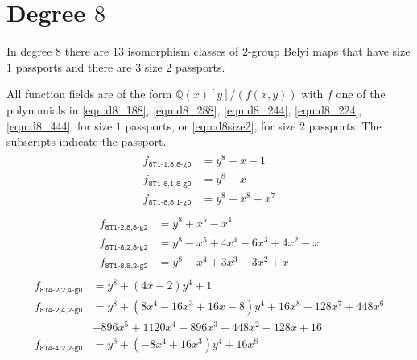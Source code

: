 \documentclass{dcthesis}
\newcommand{\QQ}{\mathbb Q}
\numberwithin{equation}{section}
\theoremstyle{definition}
\theoremstyle{remark}
\begin{document}
{{  \section{Degree $8$}{
    \label{sec:d8}
    In degree $8$ there are $13$
    isomorphism classes of $2$-group Belyi maps
    that have size $1$ passports
    and there are $3$ size $2$ passports.
    \par
    All function fields are of the form
    $\QQ(x)[y]/(f(x,y))$
    with $f$ one of the polynomials in
    \eqref{eqn:d8_188},
    \eqref{eqn:d8_288},
    \eqref{eqn:d8_244},
    \eqref{eqn:d8_224},
    \eqref{eqn:d8_444}, for size $1$ passports,
    or
    \eqref{eqn:d8size2},
    for size $2$ passports.
    The subscripts indicate the passport.
    \begin{align}
      \label{eqn:d8_188}
      \begin{split}
        f_{\texttt{8T1-1,8,8-g0}}
        &= y^8 + x - 1\\
        f_{\texttt{8T1-8,1,8-g0}}
        &= y^8 - x\\
        f_{\texttt{8T1-8,8,1-g0}}
        &= y^8 - x^8 + x^7
      \end{split}
    \end{align}
    \begin{align}
      \label{eqn:d8_288}
      \begin{split}
        f_{\texttt{8T1-2,8,8-g2}}
        &= y^8 + x^5 - x^4\\
        f_{\texttt{8T1-8,2,8-g2}}
        &= y^8 - x^5 + 4x^4 - 6x^3 + 4x^2 - x\\
        f_{\texttt{8T1-8,8,2-g2}}
        &= y^8 - x^4 + 3x^3 - 3x^2 + x
      \end{split}
    \end{align}
    \begin{align}
      \label{eqn:d8_224}
      \begin{split}
        f_{\texttt{8T4-2,2,4-g0}}
        &= y^8 + (4x - 2)y^4 + 1\\
        f_{\texttt{8T4-2,4,2-g0}}
        &= y^8 + (8x^4 - 16x^3 + 16x - 8)y^4 + 16x^8 - 128x^7 + 448x^6\\
        &- 896x^5 + 1120x^4 - 896x^3 + 448x^2 - 128x + 16\\
        f_{\texttt{8T4-4,2,2-g0}}
        &= y^8 + (-8x^4 + 16x^3)y^4 + 16x^8\\
      \end{split}
    \end{align}
    \begin{align}

\end{align}}}}
\end{document}
